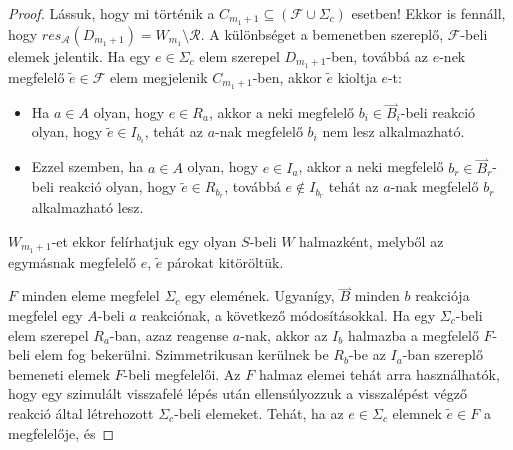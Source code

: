 \documentclass[12pt]{article}
\theoremstyle{definition}
\theoremstyle{remark}
\theoremstyle{plain}
\theoremstyle{plain}
\newcommand{\forwardhat}{\overset{\rightharpoonup}}
\newcommand{\res}{\textit{res}}
\begin{document}
\begin{proof}
        Lássuk, hogy mi történik a $C_{m_{1} + 1} \subseteq (\mathcal{F} \cup \Sigma_{c})$ esetben! Ekkor is fennáll, hogy $\res_{\mathscr{A}}(D_{m_{1} + 1}) = W_{m_{1}} \setminus \mathcal{R}$. A különbséget a bemenetben szereplő, $\mathcal{F}$-beli elemek jelentik. Ha egy $e \in \Sigma_{c}$ elem szerepel $D_{m_{1} + 1}$-ben, továbbá az $e$-nek megfelelő $\tilde{e} \in \mathcal{F}$ elem megjelenik $C_{m_{1} + 1}$-ben, akkor $\tilde{e}$ kioltja $e$-t:
        \begin{itemize}
            \item
            Ha $a \in A$ olyan, hogy $e \in R_{a}$, akkor a neki megfelelő $b_{i} \in \forwardhat B_{i}$-beli reakció olyan, hogy $\tilde{e} \in I_{b_{i}}$, tehát az $a$-nak megfelelő $b_{i}$ nem lesz alkalmazható.
            \item
            Ezzel szemben, ha $a \in A$ olyan, hogy $e \in I_{a}$, akkor a neki megfelelő $b_{r} \in \forwardhat B_{r}$-beli reakció olyan, hogy $\tilde{e} \in R_{b_{r}}$, továbbá $e \notin I_{b_{r}}$ tehát az $a$-nak megfelelő $b_{r}$ alkalmazható lesz.
        \end{itemize}
        $W_{m_{1} + 1}$-et ekkor felírhatjuk egy olyan $S$-beli $W$ halmazként, melyből az egymásnak megfelelő $e$,  $\tilde{e}$ párokat kitöröltük.


        $F$ minden eleme megfelel $\Sigma_{c}$ egy elemének. Ugyanígy, $\forwardhat B$ minden $b$ reakciója megfelel egy $A$-beli $a$ reakciónak, a következő módosításokkal. Ha egy $\Sigma_{c}$-beli elem szerepel $R_{a}$-ban, azaz reagense $a$-nak, akkor az $I_{b}$ halmazba a megfelelő $F$-beli elem fog bekerülni. Szimmetrikusan kerülnek be $R_{b}$-be az $I_{a}$-ban szereplő bemeneti elemek $F$-beli megfelelői. Az $F$ halmaz elemei tehát arra használhatók, hogy egy szimulált visszafelé lépés után ellensúlyozzuk a visszalépést végző reakció által létrehozott $\Sigma_{c}$-beli elemeket. Tehát, ha az $e \in \Sigma_{c}$ elemnek $\tilde{e} \in F$ a megfelelője, és 
    \end{proof}
\end{document}
